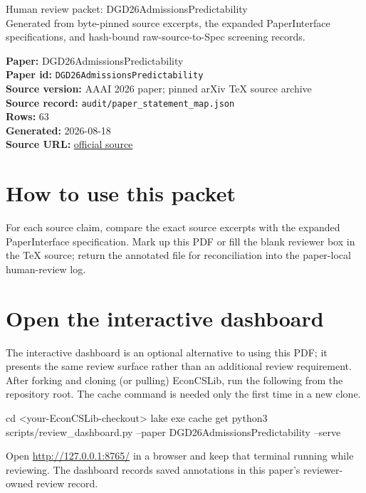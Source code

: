 \documentclass[10pt]{article}
\begin{document}
\fontsize{9}{10}\selectfont

\begin{center}
{\LARGE Human review packet: DGD26AdmissionsPredictability}\\[0.35em]
\small Generated from byte-pinned source excerpts, the expanded PaperInterface
specifications, and hash-bound raw-source-to-Spec screening records.
\end{center}

\noindent\textbf{Paper:} DGD26AdmissionsPredictability\\
\textbf{Paper id:} \texttt{DGD26AdmissionsPredictability}\\
\textbf{Source version:} AAAI 2026 paper; pinned arXiv TeX source archive\\
\textbf{Source record:} \texttt{audit/paper\_statement\_map.json}\\
\textbf{Rows:} 63\\
\textbf{Generated:} 2026-08-18\\
\textbf{Source URL:} \href{https://ojs.aaai.org/index.php/AAAI/article/view/41179}{official source}

\noindent{}\par



\section*{How to use this packet}
For each source claim, compare the exact source excerpts with the expanded
PaperInterface specification. Mark up this PDF or fill the blank reviewer box in the TeX source;
return the annotated file for reconciliation into the paper-local human-review
log.

\section*{Open the interactive dashboard}
The interactive dashboard is an optional alternative to using this PDF; it
presents the same review surface rather than an additional review requirement.
After forking and cloning (or pulling) EconCSLib, run the following from the
repository root. The cache command is needed only the first time in a new clone.
\begin{ReviewVerbatim}
cd <your-EconCSLib-checkout>
lake exe cache get
python3 scripts/review_dashboard.py --paper DGD26AdmissionsPredictability --serve
\end{ReviewVerbatim}
Open \url{http://127.0.0.1:8765/} in a browser and keep that terminal running
while reviewing. The dashboard records saved annotations in this paper's
reviewer-owned review record.
\end{document}
